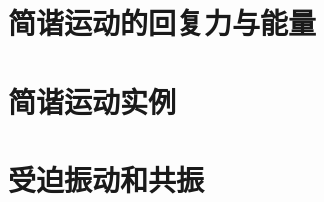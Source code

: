 \documentclass[color=purple,openany]{textbook-cn}
\begin{document}
\begin{Case}
\item \lipsum[1][3]
\item \lipsum[1][3]
\item \lipsum[1][3]
\item \lipsum[1][3]
\end{Case}

\begin{Link}
\zhlipsum[1]
\end{Link}




\section{简谐运动的回复力与能量}
\begin{Point}
\lipsum[2]
\end{Point}

\begin{Case}
\item \lipsum[1][3]
\item \lipsum[1][3]
\item \lipsum[1][3]
\item \lipsum[1][3]
\end{Case}

\begin{Link}
\zhlipsum[1]
\end{Link}




\section{简谐运动实例}
\begin{Point}
\lipsum[2]
\end{Point}

\begin{Case}
\item \lipsum[1][3]
\item \lipsum[1][3]
\item \lipsum[1][3]
\item \lipsum[1][3]
\end{Case}

\begin{Link}
\zhlipsum[1]
\end{Link}


\section{受迫振动和共振}
\begin{Point}
\lipsum[2]
\end{Point}
\end{document}

